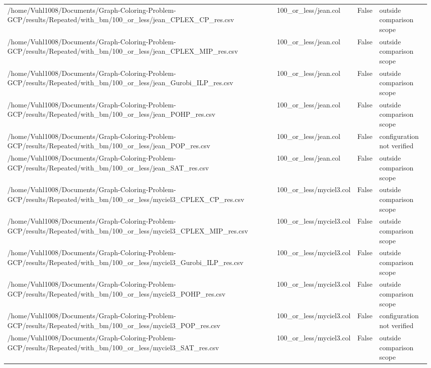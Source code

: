 \begin{table}[htbp]
\begin{tabular}{llll}
/home/Vuhl1008/Documents/Graph-Coloring-Problem-GCP/results/Repeated/with\_bm/100\_or\_less/jean\_CPLEX\_CP\_res.csv & 100\_or\_less/jean.col & False & outside comparison scope \\
/home/Vuhl1008/Documents/Graph-Coloring-Problem-GCP/results/Repeated/with\_bm/100\_or\_less/jean\_CPLEX\_MIP\_res.csv & 100\_or\_less/jean.col & False & outside comparison scope \\
/home/Vuhl1008/Documents/Graph-Coloring-Problem-GCP/results/Repeated/with\_bm/100\_or\_less/jean\_Gurobi\_ILP\_res.csv & 100\_or\_less/jean.col & False & outside comparison scope \\
/home/Vuhl1008/Documents/Graph-Coloring-Problem-GCP/results/Repeated/with\_bm/100\_or\_less/jean\_POHP\_res.csv & 100\_or\_less/jean.col & False & outside comparison scope \\
/home/Vuhl1008/Documents/Graph-Coloring-Problem-GCP/results/Repeated/with\_bm/100\_or\_less/jean\_POP\_res.csv & 100\_or\_less/jean.col & False & configuration not verified \\
/home/Vuhl1008/Documents/Graph-Coloring-Problem-GCP/results/Repeated/with\_bm/100\_or\_less/jean\_SAT\_res.csv & 100\_or\_less/jean.col & False & outside comparison scope \\
/home/Vuhl1008/Documents/Graph-Coloring-Problem-GCP/results/Repeated/with\_bm/100\_or\_less/myciel3\_CPLEX\_CP\_res.csv & 100\_or\_less/myciel3.col & False & outside comparison scope \\
/home/Vuhl1008/Documents/Graph-Coloring-Problem-GCP/results/Repeated/with\_bm/100\_or\_less/myciel3\_CPLEX\_MIP\_res.csv & 100\_or\_less/myciel3.col & False & outside comparison scope \\
/home/Vuhl1008/Documents/Graph-Coloring-Problem-GCP/results/Repeated/with\_bm/100\_or\_less/myciel3\_Gurobi\_ILP\_res.csv & 100\_or\_less/myciel3.col & False & outside comparison scope \\
/home/Vuhl1008/Documents/Graph-Coloring-Problem-GCP/results/Repeated/with\_bm/100\_or\_less/myciel3\_POHP\_res.csv & 100\_or\_less/myciel3.col & False & outside comparison scope \\
/home/Vuhl1008/Documents/Graph-Coloring-Problem-GCP/results/Repeated/with\_bm/100\_or\_less/myciel3\_POP\_res.csv & 100\_or\_less/myciel3.col & False & configuration not verified \\
/home/Vuhl1008/Documents/Graph-Coloring-Problem-GCP/results/Repeated/with\_bm/100\_or\_less/myciel3\_SAT\_res.csv & 100\_or\_less/myciel3.col & False & outside comparison scope \\

\end{tabular}
\end{table}
